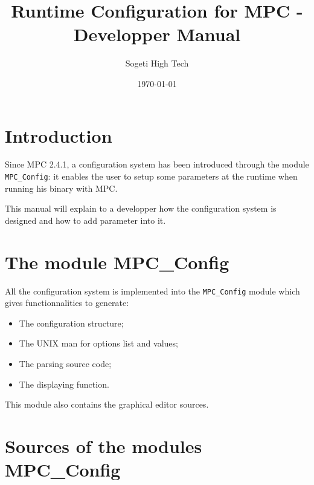 \documentclass{article}
\author{Sogeti High Tech}
\title{Runtime Configuration for MPC - Developper Manual}
\date{\today}
\begin{document}
\hypersetup{pageanchor=false,citecolor=blue}
\maketitle

\newpage
{}
\tableofcontents
\newpage
{}
\hypersetup{pageanchor=true,citecolor=blue}

\section{Introduction}

Since MPC 2.4.1, a configuration system has been introduced through the module \texttt{MPC\_Config}: it enables the user to setup some parameters at the runtime when running his binary with MPC.
\newline

\noindent This manual will explain to a developper how the configuration system is designed and how to add parameter into it.

\section{The module MPC\_Config}

All the configuration system is implemented into the \texttt{MPC\_Config} module which gives functionnalities to generate:
\begin{itemize}
\item The configuration structure;
\item The UNIX man for options list and values;
\item The parsing source code;
\item The displaying function.
\end{itemize}

\noindent This module also contains the graphical editor sources.

\newpage

\section{Sources of the modules MPC\_Config}
\end{document}
